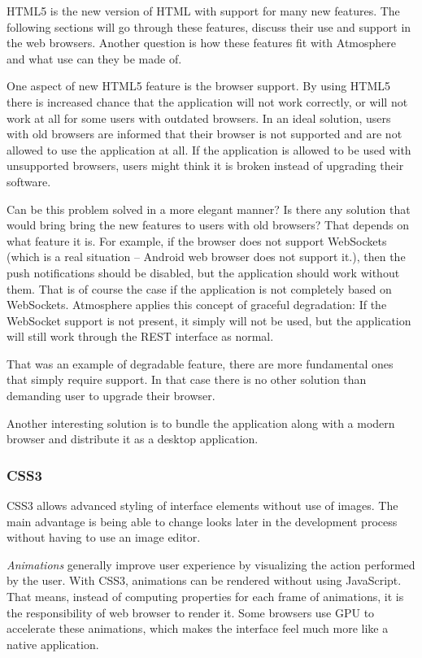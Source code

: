 HTML5 is the new version of HTML with support for many new features. The following sections will go through these features, discuss their use and support in the web browsers. Another question is how these features fit with Atmosphere and what use can they be made of.

One aspect of new HTML5 feature is the browser support. By using HTML5 there is increased chance that the application will not work correctly, or will not work at all for some users with outdated browsers. In an ideal solution, users with old browsers are informed that their browser is not supported and are not allowed to use the application at all. If the application is allowed to be used with unsupported browsers, users might think it is broken instead of upgrading their software.

Can be this problem solved in a more elegant manner? Is there any solution that would bring bring the new features to users with old browsers? That depends on what feature it is. For example, if the browser does not support WebSockets (which is a real situation – Android web browser does not support it.), then the push notifications should be disabled, but the application should work without them. That is of course the case if the application is not completely based on WebSockets. Atmosphere applies this concept of graceful degradation: If the WebSocket support is not present, it simply will not be used, but the application will still work through the REST interface as normal. \citep{javascript_bible_book}

That was an example of degradable feature, there are more fundamental ones that simply require support. In that case there is no other solution than demanding user to upgrade their browser.

Another interesting solution is to bundle the application along with a modern browser and distribute it as a desktop application.

\subsubsection{CSS3}

CSS3 allows advanced styling of interface elements without use of images. The main advantage is being able to change looks later in the development process without having to use an image editor. \citep{css3_book}

\emph{Animations} generally improve user experience by visualizing the action performed by the user. With CSS3, animations can be rendered without using JavaScript. That means, instead of computing properties for each frame of animations, it is the responsibility of web browser to render it. Some browsers use GPU to accelerate these animations, which makes the interface feel much more like a native application.

